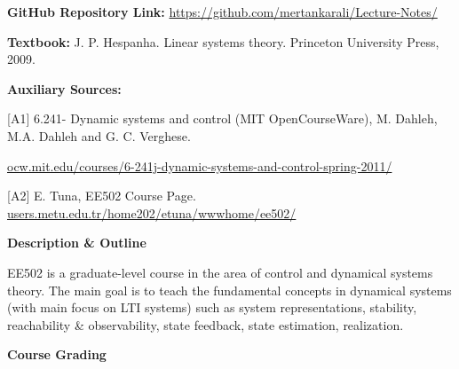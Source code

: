 \documentclass[11pt,oneside]{amsart}
\newcommand{\header}[1]{\bigbreak\textbf{#1}}
\begin{document}
\vspace{6pt}

\textbf{GitHub Repository Link:} \url{https://github.com/mertankarali/Lecture-Notes/}

\vspace{6pt}

\textbf{Textbook:} J. P. Hespanha. Linear systems theory. Princeton
University Press, 2009.

\vspace{6pt}

\textbf{Auxiliary Sources:}

\vspace{6pt}

[A1] 6.241- Dynamic systems and control (MIT OpenCourseWare),
    M. Dahleh, M.A. Dahleh and G. C. Verghese. 

\url{ocw.mit.edu/courses/6-241j-dynamic-systems-and-control-spring-2011/}

\vspace{5pt}

[A2] E. Tuna, EE502 Course Page. \url{users.metu.edu.tr/home202/etuna/wwwhome/ee502/}


\header{Description \& Outline}

\vspace{6pt}

EE502 is a graduate-level course in the area of control and dynamical
systems theory. 
The main goal is to teach the fundamental concepts in dynamical systems (with
main focus on LTI systems) such as system representations, stability,
reachability \& observability, state feedback, state estimation,
realization. 

\newpage

\header{Course Grading}
\end{document}
